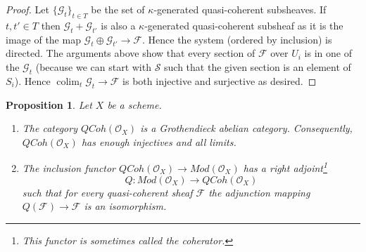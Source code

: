 \documentclass{stacks-project}
\theoremstyle{plain}
\newtheorem{proposition}[subsection]{Proposition}
\theoremstyle{definition}
\theoremstyle{remark}
\numberwithin{equation}{subsection}
\def\colim{\mathop{\mathrm{colim}}\nolimits}
\def\QCoh{\mathit{QCoh}}
\begin{document}
\begin{proof}
\medskip\noindent
Let $\{\mathcal{G}_t\}_{t \in T}$ be the set of $\kappa$-generated
quasi-coherent subsheaves. If $t, t' \in T$ then
$\mathcal{G}_t + \mathcal{G}_{t'}$ is also a $\kappa$-generated
quasi-coherent subsheaf as it is the image of the map
$\mathcal{G}_t \oplus \mathcal{G}_{t'} \to \mathcal{F}$.
Hence the system (ordered by inclusion) is directed.
The arguments above show that every section of $\mathcal{F}$ over $U_i$
is in one of the $\mathcal{G}_t$ (because we can start with $\mathcal{S}$
such that the given section is an element of $S_i$). Hence
$\colim_t \mathcal{G}_t \to \mathcal{F}$ is both injective and surjective
as desired.
\end{proof}

\begin{proposition}
\label{proposition-coherator}
Let $X$ be a scheme.
\begin{enumerate}
\item The category $\QCoh(\mathcal{O}_X)$ is a Grothendieck
abelian category. Consequently, $\QCoh(\mathcal{O}_X)$
has enough injectives and all limits.
\item The inclusion functor
$\QCoh(\mathcal{O}_X) \to \textit{Mod}(\mathcal{O}_X)$
has a right adjoint\footnote{This functor is sometimes called
the {\it coherator}.}
$$
Q : \textit{Mod}(\mathcal{O}_X) \longrightarrow \QCoh(\mathcal{O}_X)
$$
such that for every quasi-coherent sheaf $\mathcal{F}$ the adjunction mapping
$Q(\mathcal{F}) \to \mathcal{F}$ is an isomorphism.
\end{enumerate}
\end{proposition}
\end{document}
